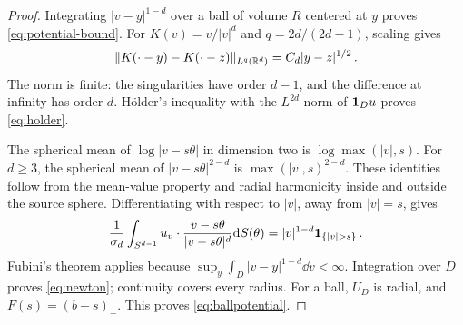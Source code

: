 \begin{proof}
Integrating $|v-y|^{1-d}$ over a ball of volume $R$ centered at $y$ proves
\eqref{eq:potential-bound}. For $K(v)=v/|v|^d$ and
$q=2d/(2d-1)$, scaling gives
\begin{equation}\label{eq:kernel-modulus}
\|K(\cdot-y)-K(\cdot-z)\|_{L^q(\mathbb R^d)}=C_d|y-z|^{1/2}\, .
\end{equation}
The norm is finite: the singularities have order $d-1$, and the
difference at infinity has order $d$. H\"older's inequality with
the $L^{2d}$ norm of $\mathbf 1_Du$ proves \eqref{eq:holder}.

The spherical mean of $\log|v-s\theta|$ in dimension two is
$\log\max(|v|,s)$. For $d\geq3$, the spherical mean of
$|v-s\theta|^{2-d}$ is $\max(|v|,s)^{2-d}$.
These identities follow from the mean-value property and radial
harmonicity inside and outside the source sphere.
Differentiating with respect to $|v|$, away from $|v|=s$, gives
\begin{equation}\label{eq:kernel-average}
\frac1{\sigma_d}\int_{S^{d-1}}
u_v\cdot\frac{v-s\theta}{|v-s\theta|^d}\dd S(\theta)
=|v|^{1-d}\ind_{\{|v|>s\}}\, .
\end{equation}
Fubini's theorem applies because
$\sup_y\int_D|v-y|^{1-d}\dd v<\infty$.
Integration over $D$ proves \eqref{eq:newton}; continuity covers
every radius. For a ball, $U_D$ is radial, and
$F(s)=(b-s)_+$. This proves \eqref{eq:ballpotential}.
\end{proof}
